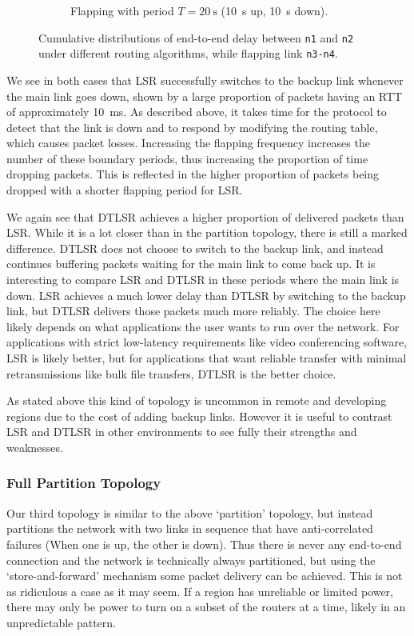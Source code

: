 \documentclass[10pt,twoside,a4paper]{article}
\begin{document}
\begin{figure}
\begin{subfigure}{15cm}
  \caption{Flapping with period $T=\SI{20}{\s}$ (\SI{10}{\s} up, \SI{10}{\s} down).}
  \label{fig:box_20}
\end{subfigure}
\caption{Cumulative distributions of end-to-end delay between \texttt{n1} and \texttt{n2} under different routing algorithms, while flapping link \texttt{n3-n4}.}
\label{fig:box}
\end{figure}

We see in both cases that LSR successfully switches to the backup link whenever the main link goes down, shown by a large proportion of packets having an RTT of approximately \SI{10}{\ms}. As described above, it takes time for the protocol to detect that the link is down and to respond by modifying the routing table, which causes packet losses. Increasing the flapping frequency increases the number of these boundary periods, thus increasing the proportion of time dropping packets. This is reflected in the higher proportion of packets being dropped with a shorter flapping period for LSR.

We again see that DTLSR achieves a higher proportion of delivered packets than LSR. While it is a lot closer than in the partition topology, there is still a marked difference. DTLSR does not choose to switch to the backup link, and instead continues buffering packets waiting for the main link to come back up. It is interesting to compare LSR and DTLSR in these periods where the main link is down. LSR achieves a much lower delay than DTLSR by switching to the backup link, but DTLSR delivers those packets much more reliably. The choice here likely depends on what applications the user wants to run over the network. For applications with strict low-latency requirements like video conferencing software, LSR is likely better, but for applications that want reliable transfer with minimal retransmissions like bulk file transfers, DTLSR is the better choice.

As stated above this kind of topology is uncommon in remote and developing regions due to the cost of adding backup links. However it is useful to contrast LSR and DTLSR in other environments to see fully their strengths and weaknesses.


\subsubsection{Full Partition Topology}

Our third topology is similar to the above `partition' topology, but instead partitions the network with two links in sequence that have anti-correlated failures (When one is up, the other is down). Thus there is never any end-to-end connection and the network is technically always partitioned, but using the `store-and-forward' mechanism some packet delivery can be achieved. This is not as ridiculous a case as it may seem. If a region has unreliable or limited power, there may only be power to turn on a subset of the routers at a time, likely in an unpredictable pattern.
\end{document}
